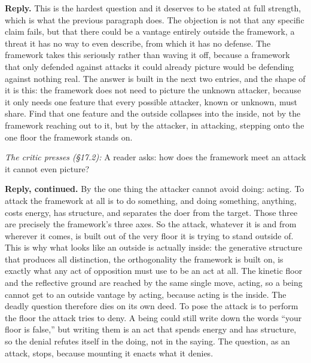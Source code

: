 \documentclass[10pt,twocolumn]{article}
\begin{document}
\textbf{Reply.} This is the hardest question and it deserves to be
stated at full strength, which is what the previous paragraph does. The
objection is not that any specific claim fails, but that there could be
a vantage entirely outside the framework, a threat it has no way to even
describe, from which it has no defense. The framework takes this
seriously rather than waving it off, because a framework that only
defended against attacks it could already picture would be defending
against nothing real. The answer is built in the next two entries, and
the shape of it is this: the framework does not need to picture the
unknown attacker, because it only needs one feature that every possible
attacker, known or unknown, must share. Find that one feature and the
outside collapses into the inside, not by the framework reaching out to
it, but by the attacker, in attacking, stepping onto the one floor the
framework stands on.

\emph{The critic presses (§17.2):} A reader asks: how does the framework
meet an attack it cannot even picture?

\textbf{Reply, continued.} By the one thing the attacker cannot avoid
doing: acting. To attack the framework at all is to do something, and
doing something, anything, costs energy, has structure, and separates
the doer from the target. Those three are precisely the framework's
three axes. So the attack, whatever it is and from wherever it comes, is
built out of the very floor it is trying to stand outside of. This is
why what looks like an outside is actually inside: the generative
structure that produces all distinction, the orthogonality the framework
is built on, is exactly what any act of opposition must use to be an act
at all. The kinetic floor and the reflective ground are reached by the
same single move, acting, so a being cannot get to an outside vantage by
acting, because acting is the inside. The deadly question therefore dies
on its own deed. To pose the attack is to perform the floor the attack
tries to deny. A being could still write down the words ``your floor is
false,'' but writing them is an act that spends energy and has
structure, so the denial refutes itself in the doing, not in the saying.
The question, as an attack, stops, because mounting it enacts what it
denies.
\end{document}
